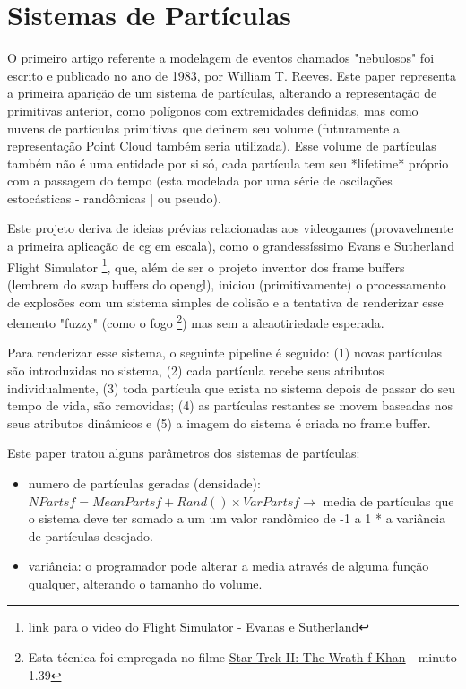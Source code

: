 \section{Sistemas de Partículas}

O primeiro artigo referente a modelagem de eventos chamados "nebulosos" foi escrito e publicado no ano de 1983, por William T. Reeves\cite{reeves1983}. Este paper representa a primeira aparição de um sistema de partículas, alterando a representação de primitivas anterior, como polígonos com extremidades definidas, mas como nuvens de partículas primitivas que definem seu volume (futuramente a representação Point Cloud também seria utilizada). Esse volume de partículas também não é uma entidade por si só, cada partícula tem seu *lifetime* próprio com a passagem do tempo (esta modelada por uma série de oscilações estocásticas - randômicas | ou pseudo). 

Este projeto deriva de ideias prévias relacionadas aos videogames (provavelmente a primeira aplicação de cg em escala), como o grandessíssimo Evans e Sutherland Flight Simulator \footnote{\href{https://www.youtube.com/watch?v=6W-qb_jHRhA}{link para o video do Flight Simulator - Evanas e Sutherland}}, que, além de ser o projeto inventor dos frame buffers (lembrem do swap buffers do opengl), iniciou (primitivamente) o processamento de explosões com um sistema simples de colisão e a tentativa de renderizar esse elemento "fuzzy" (como o fogo \footnote{Esta técnica foi empregada no filme \href{https://www.youtube.com/watch?v=x8X44NRltMM}{Star Trek II: The Wrath f Khan} - minuto 1.39 }) mas sem a aleaotiriedade esperada.

Para renderizar esse sistema, o seguinte pipeline é seguido: (1) novas partículas são introduzidas no sistema, (2) cada partícula recebe seus atributos individualmente, (3) toda partícula que exista no sistema depois de passar do seu tempo de vida, são removidas; (4) as partículas restantes se movem baseadas nos seus atributos dinâmicos e (5) a imagem do sistema é criada no frame buffer.

Este paper tratou alguns parâmetros dos sistemas de partículas:
\begin{itemize}
\item numero de partículas geradas (densidade): $NPartsf = MeanPartsf + Rand() \times VarPartsf \rightarrow$ media de partículas que o sistema deve ter somado a um um valor randômico de -1 a 1 * a variância de partículas desejado. 
\item variância: o programador pode alterar a media através de alguma função qualquer, alterando o tamanho do volume.
\end{itemize}

